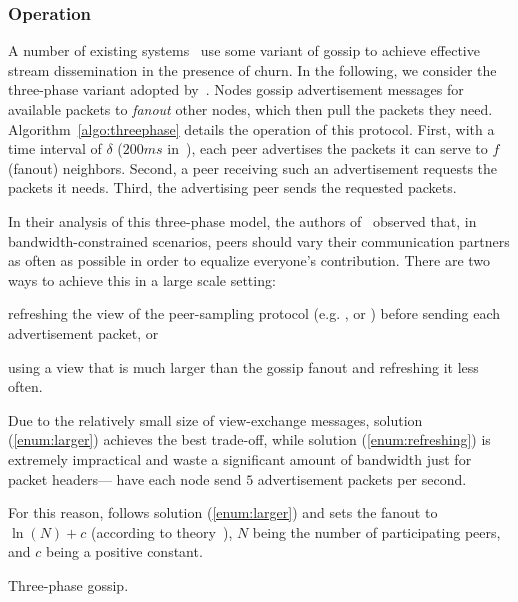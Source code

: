 \subsubsection{Operation}
A number of existing
systems~\cite{Frey09Middleware,monod:THESIS,Zhang07Understanding} use
some variant of gossip to achieve effective stream dissemination in
the presence of churn. In the following, we consider the three-phase
variant adopted
by~\cite{Frey09DSN,FlightPath,monod:THESIS,Zhang07Understanding}. Nodes
gossip advertisement messages for available packets to \emph{fanout}
other nodes, which then pull the packets they need.
Algorithm~\ref{algo:threephase} details the operation of this protocol.
First, with a time interval of $\delta$ ($200ms$
in~\cite{Frey09DSN,Frey09Middleware}), each peer advertises the packets
it can serve to $f$ (fanout) neighbors. Second, a peer receiving such
an advertisement requests the packets it needs. Third, the advertising
peer sends the requested packets.

In their analysis of this three-phase model, the authors
of~\cite{Frey09DSN} observed that, in bandwidth-constrained scenarios,
peers should vary their communication partners as often as possible in
order to equalize everyone's contribution. There are two ways to
achieve this in a large scale setting:
\begin{inparaenum}[(i)]
\item \label{enum:refreshing} refreshing the view of the peer-sampling protocol
  (e.g. \CYCLON, or \SPRAY) before sending each advertisement packet, or
\item \label{enum:larger} using a view that is much larger than the gossip
  fanout and refreshing it less often.
\end{inparaenum}
Due to the relatively small size of view-exchange messages, solution
(\ref{enum:larger}) achieves the best trade-off, while solution
(\ref{enum:refreshing}) is extremely impractical and waste a significant
amount of bandwidth just for packet headers---\cite{Frey09DSN,Frey09Middleware}
have each node send $5$ advertisement packets per second.

For this reason, \cite{frey:hal-01479885} follows solution (\ref{enum:larger})
and sets the fanout to $\ln(N)+c$ (according to theory~\cite{PRD}), $N$ being the
number of participating peers, and $c$ being a positive constant.

\begin{algorithm}[h]
  
  \caption{\label{algo:threephase}Three-phase gossip.}
\end{algorithm}



